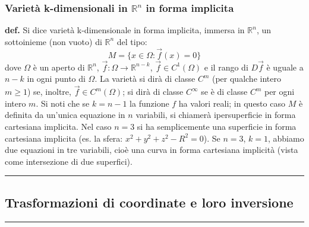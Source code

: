 \subsubsection{Varietà k-dimensionali in $\mathbb{R}^n$ in forma implicita}
\textbf{def.} Si dice varietà k-dimensionale in forma implicita, immersa in $\mathbb{R}^n$, un sottoinieme (non vuoto) di $\mathbb{R}^n$ del tipo:
\[
    M = \{x \in \Omega : \vec{f}(x) = 0\}
\]
dove $\Omega$ è un aperto di $\mathbb{R}^n$, $\vec{f}: \Omega \rightarrow \mathbb{R}^{n-k}$, $\vec{f} \in C^1(\Omega)$ e il rango di $D \vec{f}$ è uguale a $n-k$ in ogni punto di $\Omega$. La varietà si dirà di classe $C^m$ (per qualche intero $m \geq 1$) se, inoltre, $\vec{f} \in C^m (\Omega)$; si dirà di classe $C^{\infty}$ se è di classe $C^m$ per ogni intero $m$.\newline
\newline
Si noti che se $k = n-1$ la funzione $f$ ha valori reali; in questo caso $M$ è definita da un'unica equazione in $n$ variabili, si chiamerà ipersuperficie in forma cartesiana implicita. Nel caso $n=3$ si ha semplicemente una superficie in forma cartesiana implicita (es. la sfera: $x^2 + y^2 + z^2 - R^2= 0$).\newline
\newline
Se $n=3$, $k=1$, abbiamo due equazioni in tre variabili, cioè una curva in forma cartesiana implicità (vista come intersezione di due superfici).\newline
\rule{\textwidth}{2pt}
\subsection{Trasformazioni di coordinate e loro inversione}
\rule{\textwidth}{0,4pt}
